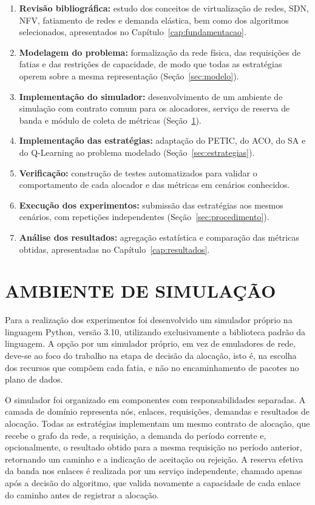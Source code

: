 \begin{enumerate}
    \item \textbf{Revisão bibliográfica:} estudo dos conceitos de virtualização de redes, SDN, NFV, fatiamento de redes e demanda elástica, bem como dos algoritmos selecionados, apresentados no Capítulo~\ref{cap:fundamentacao}. %
    \item \textbf{Modelagem do problema:} formalização da rede física, das requisições de fatias e das restrições de capacidade, de modo que todas as estratégias operem sobre a mesma representação (Seção~\ref{sec:modelo}).
    \item \textbf{Implementação do simulador:} desenvolvimento de um ambiente de simulação com contrato comum para os alocadores, serviço de reserva de banda e módulo de coleta de métricas (Seção~\ref{sec:ambiente}).
    \item \textbf{Implementação das estratégias:} adaptação do PETIC, do ACO, do SA e do Q-Learning ao problema modelado (Seção~\ref{sec:estrategias}).
    \item \textbf{Verificação:} construção de testes automatizados para validar o comportamento de cada alocador e das métricas em cenários conhecidos.
    \item \textbf{Execução dos experimentos:} submissão das estratégias aos mesmos cenários, com repetições independentes (Seção~\ref{sec:procedimento}).
    \item \textbf{Análise dos resultados:} agregação estatística e comparação das métricas obtidas, apresentadas no Capítulo~\ref{cap:resultados}. %
\end{enumerate}

\section{AMBIENTE DE SIMULAÇÃO}
\label{sec:ambiente}

Para a realização dos experimentos foi desenvolvido um simulador próprio na linguagem Python, versão 3.10, utilizando exclusivamente a biblioteca padrão da linguagem. A opção por um simulador próprio, em vez de emuladores de rede, deve-se ao foco do trabalho na etapa de decisão da alocação, isto é, na escolha dos recursos que compõem cada fatia, e não no encaminhamento de pacotes no plano de dados.

O simulador foi organizado em componentes com responsabilidades separadas. A camada de domínio representa nós, enlaces, requisições, demandas e resultados de alocação. Todas as estratégias implementam um mesmo contrato de alocação, que recebe o grafo da rede, a requisição, a demanda do período corrente e, opcionalmente, o resultado obtido para a mesma requisição no período anterior, retornando um caminho e a indicação de aceitação ou rejeição. A reserva efetiva da banda nos enlaces é realizada por um serviço independente, chamado apenas após a decisão do algoritmo, que valida novamente a capacidade de cada enlace do caminho antes de registrar a alocação.


